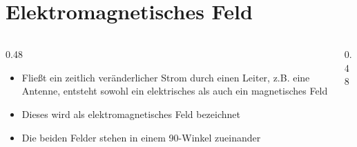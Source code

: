 
\section{Elektromagnetisches Feld}
\label{section:em_feld}
\begin{frame}%
    \begin{columns}
        \begin{column}{0.48\textwidth}
            \begin{itemize}
                \item Fließt ein zeitlich veränderlicher Strom durch einen Leiter, z.B. eine Antenne, entsteht sowohl ein elektrisches als auch ein magnetisches Feld
                \item Dieses wird als elektromagnetisches Feld bezeichnet
                \item Die beiden Felder stehen in einem 90\textdegree-Winkel zueinander
            \end{itemize}
        \end{column}
        \begin{column}{0.48\textwidth}
        \end{column}
    \end{columns}
\end{frame}

